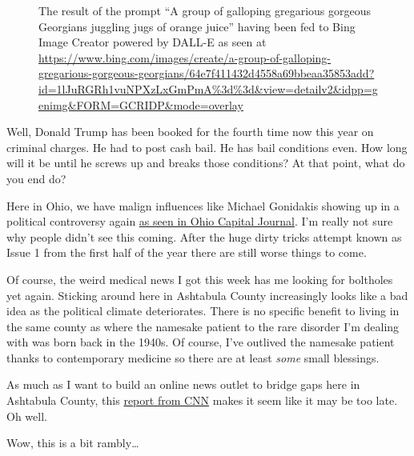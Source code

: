 \begin{figure}
\centering
{}
\caption{The result of the prompt ``A group of galloping gregarious
gorgeous Georgians juggling jugs of orange juice'' having been fed to
Bing Image Creator powered by DALL-E as seen at
\url{https://www.bing.com/images/create/a-group-of-galloping-gregarious-gorgeous-georgians/64e7f411432d4558a69bbeaa35853add?id=1lJuRGRh1vuNPXzLxGmPmA\%3d\%3d&view=detailv2&idpp=genimg&FORM=GCRIDP&mode=overlay}}
\end{figure}

Well, Donald Trump has been booked for the fourth time now this year on
criminal charges. He had to post cash bail. He has bail conditions even.
How long will it be until he screws up and breaks those conditions? At
that point, what do you end do?

Here in Ohio, we have malign influences like Michael Gonidakis showing
up in a political controversy again
\href{https://ohiocapitaljournal.com/2023/08/24/split-ballot-board-approves-reproductive-rights-amendment-summary-written-by-ohio-sec-of-state/}{as
seen in Ohio Capital Journal}. I'm really not sure why people didn't see
this coming. After the huge dirty tricks attempt known as Issue 1 from
the first half of the year there are still worse things to come.

Of course, the weird medical news I got this week has me looking for
boltholes yet again. Sticking around here in Ashtabula County
increasingly looks like a bad idea as the political climate
deteriorates. There is no specific benefit to living in the same county
as where the namesake patient to the rare disorder I'm dealing with was
born back in the 1940s. Of course, I've outlived the namesake patient
thanks to contemporary medicine so there are at least \emph{some} small
blessings.

As much as I want to build an online news outlet to bridge gaps here in
Ashtabula County, this
\href{https://www.cnn.com/2023/08/17/media/facebook-referral-traffic-reliable-sources/index.html}{report
from CNN} makes it seem like it may be too late. Oh well.

Wow, this is a bit rambly\ldots{}
